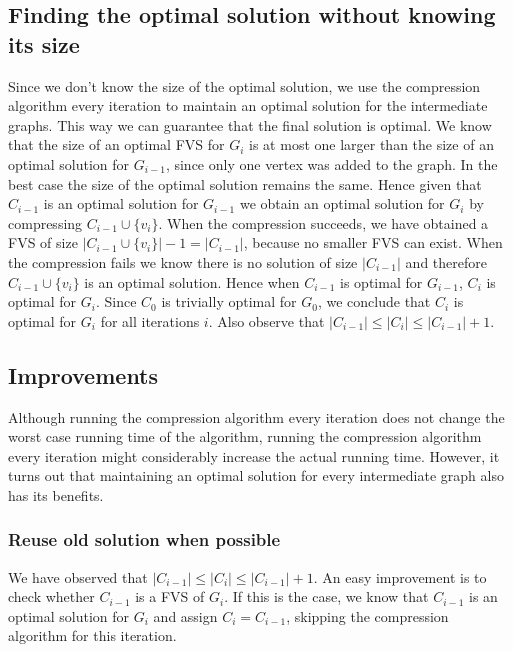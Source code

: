 \subsection{Finding the optimal solution without knowing its size} \label{sec:noK}
Since we don't know the size of the
optimal solution, we use the compression algorithm every iteration to maintain an optimal solution for the intermediate
graphs. This way we can guarantee that the final solution is optimal. We know that the size of an optimal FVS for $G_i$
is at most one larger than the size of an optimal solution for $G_{i-1}$, since only one vertex was added to the graph.
In the best case the size of the optimal solution remains the same. Hence given that $C_{i-1}$ is an optimal solution
for $G_{i-1}$ we obtain an optimal solution for $G_i$ by compressing $C_{i-1} \cup \{v_i\}$. When the compression
succeeds, we have obtained a FVS of size $|C_{i-1} \cup \{v_i\}|-1 = |C_{i-1}|$, because no smaller FVS can exist. When
the compression fails we know there is no solution of size $|C_{i-1}|$ and therefore $C_{i-1} \cup \{v_i\}$ is an
optimal solution. Hence when $C_{i-1}$ is optimal for $G_{i-1}$, $C_i$ is optimal for $G_i$. Since $C_0$ is trivially
optimal for $G_0$, we conclude that $C_i$ is optimal for $G_i$ for all iterations $i$. Also observe that $|C_{i-1}| \leq
|C_i| \leq |C_{i-1}|+1$.

\subsection{Improvements}
Although running the compression algorithm every iteration does not change the worst case
running time of the algorithm, running the compression algorithm every iteration might considerably increase the actual
running time. However, it turns out that maintaining an optimal solution for every intermediate graph also has its
benefits. 

\subsubsection{Reuse old solution when possible}
We have observed that $|C_{i-1}| \leq |C_i| \leq |C_{i-1}|+1$. An easy
improvement is to check whether $C_{i-1}$ is a FVS of $G_i$. If this is the case, we know that $C_{i-1}$ is an optimal
solution for $G_i$ and assign $C_i = C_{i-1}$, skipping the compression algorithm for this iteration.

